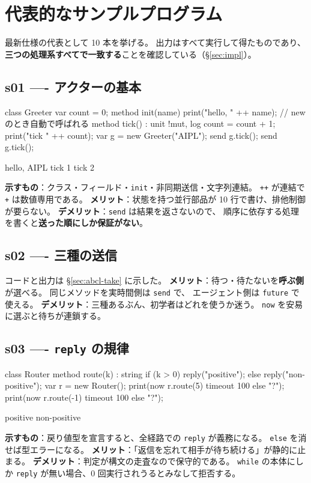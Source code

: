 \documentclass[11pt,a4paper]{ltjsarticle}
\theoremstyle{definition}
\theoremstyle{remark}
\begin{document}
\section{代表的なサンプルプログラム}
\label{sec:samples}

最新仕様の代表として 10 本を挙げる。
出力はすべて実行して得たものであり、
\textbf{三つの処理系すべてで一致する}ことを確認している（\S\ref{sec:impl}）。

\subsection{s01 ---- アクターの基本}
\begin{aipl}
class Greeter {
  var count = 0;
  method init(name) { print("hello, " ++ name); }   // new のとき自動で呼ばれる
  method tick() : unit !{mut, log} {
    count = count + 1;
    print("tick " ++ count);
  }
}
var g = new Greeter("AIPL");
send g.tick();
send g.tick();
\end{aipl}
\begin{term}
hello, AIPL
tick 1
tick 2
\end{term}
\textbf{示すもの}：クラス・フィールド・\texttt{init}・非同期送信・文字列連結。
\texttt{++} が連結で \texttt{+} は数値専用である。
\textbf{メリット}：状態を持つ並行部品が 10 行で書け、排他制御が要らない。
\textbf{デメリット}：\texttt{send} は結果を返さないので、
順序に依存する処理を書くと\textbf{送った順にしか保証がない}。

\subsection{s02 ---- 三種の送信}
コードと出力は \S\ref{sec:abcl-take} に示した。
\textbf{メリット}：待つ・待たないを\textbf{呼ぶ側}が選べる。
同じメソッドを実時間側は \texttt{send} で、
エージェント側は \texttt{future} で使える。
\textbf{デメリット}：三種あるぶん、初学者はどれを使うか迷う。
\texttt{now} を安易に選ぶと待ちが連鎖する。

\subsection{s03 ---- \texttt{reply} の規律}
\begin{aipl}
class Router {
  method route(k) : string {
    if (k > 0) { reply("positive"); } else { reply("non-positive"); }
  }
}
var r = new Router();
print(now r.route(5)  timeout 100 else "?");
print(now r.route(-1) timeout 100 else "?");
\end{aipl}
\begin{term}
positive
non-positive
\end{term}
\textbf{示すもの}：戻り値型を宣言すると、全経路での \texttt{reply} が義務になる。
\texttt{else} を消せば型エラーになる。
\textbf{メリット}：「返信を忘れて相手が待ち続ける」が静的に止まる。
\textbf{デメリット}：判定が構文の走査なので保守的である。
\texttt{while} の本体にしか \texttt{reply} が無い場合、0 回実行されうるとみなして拒否する。
\end{document}

